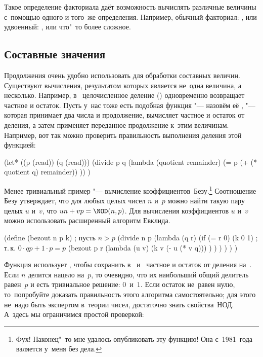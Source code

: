 Такое определение факториала даёт возможность вычислять различные величины
с~помощью одного и того~же определения. Например, обычный факториал: , или удвоенный: ,
или что"~то более сложное.


\subsection{Составные значения}\label{escape/pr-cont/ssect:multiple}

Продолжения очень удобно использовать для обработки составных величин.
Существуют вычисления, результатом которых является не~одна величина, а
несколько. Например, в~{\CommonLisp} целочисленное деление ()
одновременно возвращает частное и остаток. Пусть у~нас тоже есть подобная
функция "--- назовём её , "--- которая принимает два числа и
продолжение, вычисляет частное и остаток от деления, а затем применяет
переданное продолжение к~этим величинам. Например, вот так можно проверить
правильность выполнения деления этой функцией:

\begin{code:lisp}
(let* ((p (read)) (q (read)))
  (divide p q (lambda (quotient remainder)
                (= p (+ (* quotient q) remainder)) )) )
\end{code:lisp}

Менее тривиальный пример "--- вычисление коэффициентов~Безу.\footnote*{Фух!
Наконец"~то мне удалось опубликовать эту функцию! Она с~1981~года валяется
у~меня без дела.} Соотношение Безу утверждает, что для любых целых чисел $n$
и~$p$ можно найти такую пару целых $u$ и~$v$, что $un + vp = \NOD(n, p)$. Для
вычисления коэффициентов $u$ и~$v$ можно использовать расширенный алгоритм
Евклида.

\begin{code:lisp}
(define (bezout n p k)  ; пусть $n > p$
  (divide
   n p (lambda (q r)
         (if (= r 0)
             (k 0 1)    ; т.\,к. $0 \cdot qp + 1 \cdot p = p$
             (bezout
              p r (lambda (u v)
                    (k v (- u (* v q))) ) ) ) ) ) )
\end{code:lisp}

Функция  использует , чтобы сохранить в~ и~
частное и остаток от деления  на~. Если $n$ делится нацело на~$p$,
то очевидно, что их наибольший общий делитель равен~$p$ и есть тривиальное
решение: $0$~и~$1$. Если остаток не~равен нулю, то\textdots\ попробуйте доказать
правильность этого алгоритма самостоятельно; для этого не~надо быть экспертом
в~теории чисел, достаточно знать свойства~НОД. А~здесь мы ограничимся простой
проверкой:

